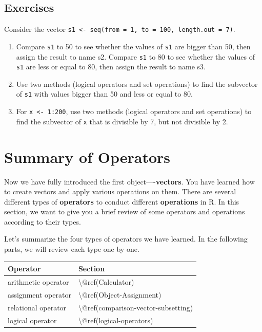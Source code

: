\documentclass[
]{book}
\begin{document}
\hypertarget{exercises-10}{%
\subsection{Exercises}\label{exercises-10}}

Consider the vector \texttt{s1\ \textless{}-\ seq(from\ =\ 1,\ to\ =\ 100,\ length.out\ =\ 7)}.

\begin{enumerate}
\def\labelenumi{\arabic{enumi}.}
\item
  Compare \texttt{s1} to 50 to see whether the values of \texttt{s1} are bigger than 50, then assign the result to name s2. Compare \texttt{s1} to 80 to see whether the values of \texttt{s1} are less or equal to 80, then assign the result to name s3.
\item
  Use two methods (logical operators and set operations) to find the subvector of \texttt{s1} with values bigger than 50 and less or equal to 80.
\item
  For \texttt{x\ \textless{}-\ 1:200}, use two methods (logical operators and set operations) to find the subvector of \texttt{x} that is divisible by 7, but not divisible by 2.
\end{enumerate}

\hypertarget{summary-of-operators}{%
\section{Summary of Operators}\label{summary-of-operators}}

Now we have fully introduced the first object----\textbf{vectors}. You have learned how to create vectors and apply various operations on them. There are several different types of \textbf{operators} to conduct different \textbf{operations} in R. In this section, we want to give you a brief review of some operators and operations according to their types.

Let's summarize the four types of operators we have learned. In the following parts, we will review each type one by one.

\begin{tabular}{l|l}
\hline
Operator & Section\\
\hline
arithmetic operator & \textbackslash{}@ref(Calculator)\\
\hline
assignment operator & \textbackslash{}@ref(Object-Assignment)\\
\hline
relational operator & \textbackslash{}@ref(comparison-vector-subsetting)\\
\hline
logical operator & \textbackslash{}@ref(logical-operators)\\
\hline
\end{tabular}
\end{document}
